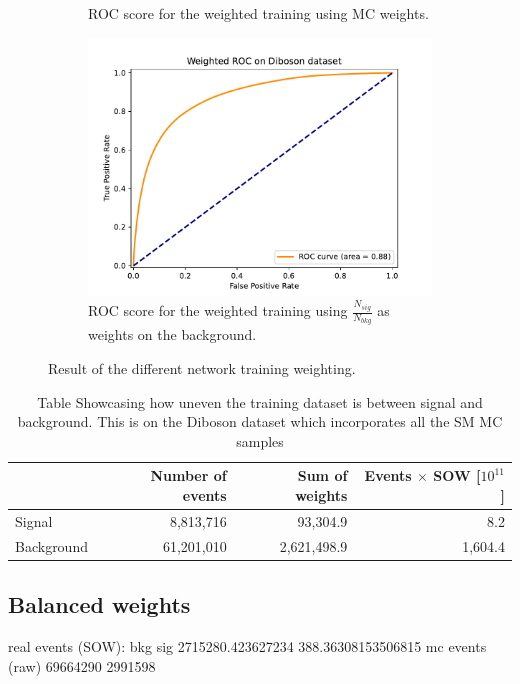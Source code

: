 \documentclass[14pt, a4paper]{book}
\begin{document}
\begin{figure}[!ht]
\begin{subfigure}[b]{0.49\textwidth}
        \caption{ROC score for the weighted training using MC weights.}\label{fig:DibosonROCMC}
     \end{subfigure}
     \begin{subfigure}[b]{0.49\textwidth}
        \centering
        \includegraphics[width=1\textwidth]{ROC_w.pdf}
        \caption{ROC score for the weighted training using $\frac{N_{sig}}{N_{bkg}}$ as weights on the background.}\label{fig:DibosonROCW}
     \end{subfigure}
	\caption{Result of the different network training weighting.}\label{fig:DibosonROC}
\end{figure}
\begin{table}[!h]
    \centering
    \begin{tabular}{l|r|r|r}\midrule\midrule
                    & Number of events & Sum of weights & Events $\times$ SOW [$10^{11}$]\\\midrule
         Signal     & 8,813,716        & 93,304.9       & 8.2\\
         Background & 61,201,010       & 2,621,498.9    & 1,604.4 \\ \midrule\midrule
    \end{tabular}
    \caption[Unbalanced Diboson training dataset]{Table Showcasing how uneven the training dataset is between signal and background. This is on the Diboson dataset which incorporates all the SM MC samples}
    \label{tab:UnbalancedDibosonTraining}
\end{table}

\subsection{Balanced weights}
real events (SOW): bkg sig 2715280.423627234 388.36308153506815 
mc events (raw) 69664290 2991598
\clearpage
\end{document}
